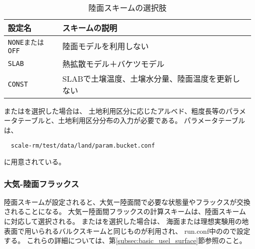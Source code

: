 \\

\begin{table}[h]
\begin{center}
  \caption{陸面スキームの選択肢}
  \label{tab:nml_land}
  \begin{tabularx}{150mm}{lX} \hline
    \rowcolor[gray]{0.9}  設定名 & スキームの説明 \\ \hline
      \verb|NONEまたはOFF| & 陸面モデルを利用しない                       \\
      \verb|SLAB|          & 熱拡散モデル＋バケツモデル                    \\
      \verb|CONST|         & SLABで土壌温度、土壌水分量、陸面温度を更新しない \\
    \hline
  \end{tabularx}
\end{center}
\end{table}

\vspace{\baselineskip}
またはを選択した場合は、
土地利用区分に応じたアルベド、粗度長等のパラメータテーブルと、土地利用区分分布の入力が必要である。
パラメータテーブルは、
\begin{verbatim}
  scale-rm/test/data/land/param.bucket.conf
\end{verbatim}
に用意されている。\\


\subsubsection{大気-陸面フラックス}
陸面スキームが設定されると、大気ー陸面間で必要な状態量やフラックスが交換されることになる。
大気ー陸面間フラックスの計算スキームは、陸面スキームに対応して選択される。
またはを選択した場合は、
海面または理想実験用の地表面で用いられるバルクスキームと同じものが利用され、
run.conf中のので設定する。
これらの詳細については、第\ref{subsec:basic_usel_surface}節参照のこと。\\



